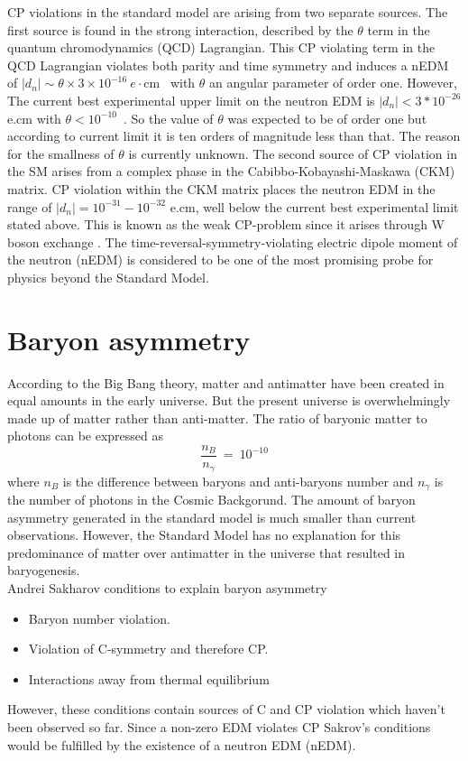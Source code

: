 CP violations in the standard model are arising from two separate
sources.  The first source is found in the strong interaction,
described by the $\theta$ term in the quantum chromodynamics (QCD)
Lagrangian.  This CP violating term in the QCD Lagrangian violates
both parity and time symmetry and induces a nEDM of
$|d_n|\sim\theta\times 3\times
10^{−16}~e\cdot$cm~\cite{PhysRevLett.97.131801} with $\theta$ an
angular parameter of order one.  However, The current best
experimental upper limit on the neutron EDM is $|d_n| < 3*10^{−26}$
e.cm with $\theta <10^{-10}$~\cite{PhysRevD.92.092003}.  So the value
of $\theta$ was expected to be of order one but according to current
limit it is ten orders of magnitude less than that.  The reason for
the smallness of $\theta$ is currently unknown. The second source of
CP violation in the SM arises from a complex phase in the
Cabibbo-Kobayashi-Maskawa (CKM) matrix\cite{PhysRevLett.10.531}.  CP
violation within the CKM matrix places the neutron EDM in the range of
$|d_n| = 10^{-31} - 10^{-32}$ e.cm, well below the current best
experimental limit stated above. This is known as the weak CP-problem
since it arises through W boson exchange \cite{PhysRevLett.82.904}.
The time-reversal-symmetry-violating electric dipole moment of the
neutron (nEDM) is considered to be one of the most promising probe for
physics beyond the Standard Model.
\section{Baryon asymmetry}
According to the Big Bang theory, matter and antimatter have been created in equal amounts in the early
universe. But the present universe is overwhelmingly made up of matter rather than anti-matter. The ratio of baryonic matter to photons can be expressed as
\begin{equation}
  \frac{ n_B }{n_\gamma}~ = ~10^{-10}    
\end{equation}
where $n_B$ is the difference between  baryons and anti-baryons number and $n_\gamma$ is the number of photons in the Cosmic Backgorund. The amount of baryon asymmetry generated in the standard model is much smaller than current observations. However,  the Standard Model has no explanation for this predominance of matter over antimatter in the universe  that resulted in baryogenesis.\\
Andrei Sakharov conditions to explain  baryon asymmetry\cite{budker2013optical}\cite{PhysRevLett.10.531} 
\begin{itemize}
    \item Baryon number violation.
    \item Violation of C-symmetry and therefore CP.
    \item Interactions away from thermal equilibrium
\end{itemize}
However, these conditions contain sources of C and CP violation which haven't been observed so far. Since a non-zero EDM violates CP Sakrov's conditions  would be fulfilled by the existence of a neutron EDM (nEDM).


